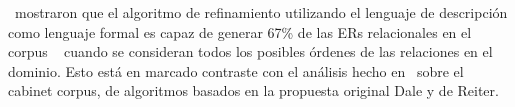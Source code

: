 
\cite{arec2:2008:Areces}~mostraron que el algoritmo de refinamiento utilizando el lenguaje de descripci\'on \el como lenguaje formal es capaz de generar 67\% de
las ERs relacionales en el corpus ~\cite{viethen06:_algor_for_gener_refer_expres} cuando se consideran todos los posibles \'ordenes de las relaciones en el dominio. Esto est\'a en marcado contraste con el an\'alisis hecho en~\cite{viethen06:_algor_for_gener_refer_expres} sobre el cabinet corpus, de algoritmos basados en la propuesta original Dale y de Reiter.\\



